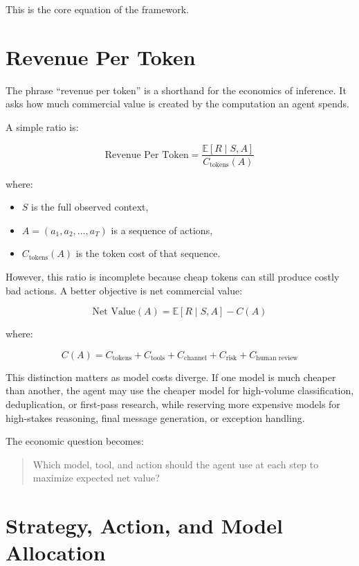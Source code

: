 \documentclass[12pt]{article}
\begin{document}
This is the core equation of the framework.

\section{Revenue Per Token}

The phrase ``revenue per token'' is a shorthand for the economics of inference.
It asks how much commercial value is created by the computation an agent spends.

A simple ratio is:

\[
\text{Revenue Per Token}
=
\frac{\mathbb{E}[R \mid S, A]}{C_{\text{tokens}}(A)}
\]

where:

\begin{itemize}
    \item \(S\) is the full observed context,
    \item \(A = (a_1, a_2, \ldots, a_T)\) is a sequence of actions,
    \item \(C_{\text{tokens}}(A)\) is the token cost of that sequence.
\end{itemize}

However, this ratio is incomplete because cheap tokens can still produce costly
bad actions. A better objective is net commercial value:

\[
\text{Net Value}(A)
=
\mathbb{E}[R \mid S, A] - C(A)
\]

where:

\[
C(A)
=
C_{\text{tokens}}
+
C_{\text{tools}}
+
C_{\text{channel}}
+
C_{\text{risk}}
+
C_{\text{human review}}
\]

This distinction matters as model costs diverge. If one model is much cheaper
than another, the agent may use the cheaper model for high-volume classification,
deduplication, or first-pass research, while reserving more expensive models for
high-stakes reasoning, final message generation, or exception handling.

The economic question becomes:

\begin{quote}
    Which model, tool, and action should the agent use at each step to maximize
    expected net value?
\end{quote}

\section{Strategy, Action, and Model Allocation}
\end{document}
